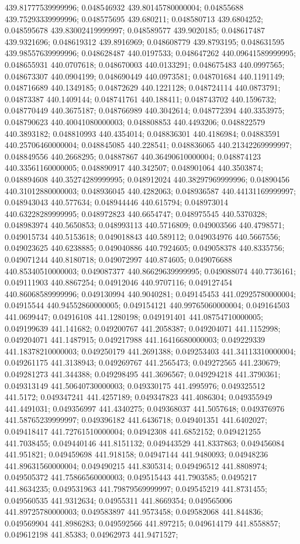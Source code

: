 439.81777539999996; 0.048546932 439.80145780000004; 0.04855688 439.75293339999996; 0.048575695 439.680211; 0.048580713 439.6804252; 0.048595678 439.83002419999997; 0.048589577 439.9020185; 0.048617487 439.9321696; 0.048619312 439.8916969; 0.048608779 439.8793195; 0.048631595 439.98557639999996; 0.048628487 440.0197533; 0.048647262 440.09641589999995; 0.048655931 440.0707618; 0.048670003 440.0133291; 0.048675483 440.0997565; 0.048673307 440.0904199; 0.048690449 440.0973581; 0.048701684 440.1191149; 0.048716689 440.1349185; 0.04872629 440.1221128; 0.048724114 440.0873791; 0.04873387 440.1409144; 0.048741761 440.188411; 0.048743702 440.1596732; 0.048770449 440.3675187; 0.048766989 440.3042614; 0.048772394 440.3353975; 0.048790623 440.40041080000003; 0.048808853 440.4493206; 0.048822579 440.3893182; 0.048810993 440.4354014; 0.048836301 440.4186984; 0.04883591 440.25706460000004; 0.048845085 440.228541; 0.048836065 440.21342269999997; 0.048849556 440.2668295; 0.04887867 440.36490610000004; 0.048874123 440.33561160000005; 0.048890917 440.342507; 0.048901064 440.3503874; 0.048894608 440.35274289999995; 0.048912024 440.38297969999996; 0.04890456 440.31012880000003; 0.048936045 440.4282063; 0.048936587 440.44131169999997; 0.048943043 440.577634; 0.048944446 440.615794; 0.048973014 440.63228289999995; 0.048972823 440.6654747; 0.048975545 440.5370328; 0.048983974 440.5650853; 0.048993113 440.5716809; 0.049003566 440.4798571; 0.049015734 440.5153618; 0.049018843 440.589112; 0.049034976 440.5667556; 0.049023625 440.6238885; 0.049040886 440.7924605; 0.049058378 440.8335756; 0.049071244 440.8180718; 0.049072997 440.874605; 0.049076688 440.85340510000003; 0.049087377 440.86629639999995; 0.049088074 440.7736161; 0.049111903 440.8867254; 0.04912046 440.9707116; 0.049127454 440.86068589999996; 0.049130994 440.9040281; 0.049145453 441.02925780000004; 0.04915544 440.94552860000005; 0.049154121 440.99765060000004; 0.049164503 441.0699447; 0.04916108 441.1280198; 0.049191401 441.08754710000005; 0.049199639 441.141682; 0.049200767 441.2058387; 0.049204071 441.1152998; 0.049204071 441.1487915; 0.049217988 441.16416680000003; 0.049229339 441.18378210000003; 0.049250179 441.2691388; 0.049253403 441.34113310000004; 0.049261175 441.3138943; 0.049269767 441.2565473; 0.049272565 441.230679; 0.049281273 441.344388; 0.049298495 441.3696567; 0.049294218 441.3790361; 0.049313149 441.50640730000003; 0.049330175 441.4995976; 0.049325512 441.5172; 0.049347241 441.4257189; 0.049347823 441.4086304; 0.049355949 441.4491031; 0.049356997 441.4340275; 0.049368037 441.5057648; 0.049376976 441.58765239999997; 0.049396182 441.6436718; 0.049401351 441.6402027; 0.049418417 441.72761510000004; 0.04942308 441.6852152; 0.049421255 441.7038455; 0.049440146 441.8151132; 0.049443529 441.8337863; 0.049456084 441.951821; 0.049459698 441.918158; 0.04947144 441.9480093; 0.04948236 441.89631560000004; 0.049490215 441.8305314; 0.049496512 441.8808974; 0.049505372 441.75866560000003; 0.049515443 441.7903585; 0.0495217 441.8634235; 0.049531963 441.79879569999997; 0.049545219 441.8731455; 0.049560535 441.9312634; 0.04955311 441.8669354; 0.049565006 441.89725780000003; 0.049583897 441.9573458; 0.049582068 441.844836; 0.049569904 441.8986283; 0.049592566 441.897215; 0.049614179 441.8558857; 0.049612198 441.85383; 0.04962973 441.9471527; 